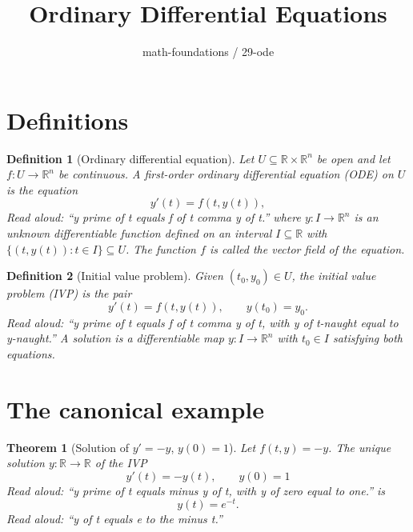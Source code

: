 \documentclass[11pt]{article}
\title{Ordinary Differential Equations}
\author{math-foundations / 29-ode}
\date{}
\newtheorem{theorem}{Theorem}
\newtheorem{definition}{Definition}
\begin{document}
\maketitle

\section{Definitions}

\begin{definition}[Ordinary differential equation]
Let $U \subseteq \mathbb{R} \times \mathbb{R}^n$ be open and let $f : U \to \mathbb{R}^n$ be
continuous. A \emph{first-order ordinary differential equation} (ODE) on $U$ is the equation
\[
y'(t) = f(t, y(t)),
\]
\emph{Read aloud:} ``y prime of t equals f of t comma y of t.''
where $y : I \to \mathbb{R}^n$ is an unknown differentiable function defined on an interval
$I \subseteq \mathbb{R}$ with $\{(t, y(t)) : t \in I\} \subseteq U$. The function $f$ is called the
\emph{vector field} of the equation.
\end{definition}

\begin{definition}[Initial value problem]
Given $(t_0, y_0) \in U$, the \emph{initial value problem} (IVP) is the pair
\[
y'(t) = f(t, y(t)), \qquad y(t_0) = y_0.
\]
\emph{Read aloud:} ``y prime of t equals f of t comma y of t, with y of t-naught equal to y-naught.''
A \emph{solution} is a differentiable map $y : I \to \mathbb{R}^n$ with $t_0 \in I$ satisfying both
equations.
\end{definition}

\section{The canonical example}

\begin{theorem}[Solution of $y' = -y$, $y(0) = 1$]
\label{thm:exp-decay}
Let $f(t, y) = -y$. The unique solution $y : \mathbb{R} \to \mathbb{R}$ of the IVP
\[
y'(t) = -y(t), \qquad y(0) = 1
\]
\emph{Read aloud:} ``y prime of t equals minus y of t, with y of zero equal to one.''
is
\[
y(t) = e^{-t}.
\]
\emph{Read aloud:} ``y of t equals e to the minus t.''
\end{theorem}
\end{document}
